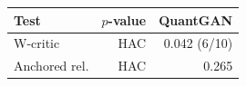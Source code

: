 \begin{tabular}{lrr}
\toprule
Test & $p$-value & QuantGAN \\
\midrule
W-critic & HAC & 0.042 (6/10) \\
Anchored rel. & HAC & 0.265 \\
\bottomrule
\end{tabular}
